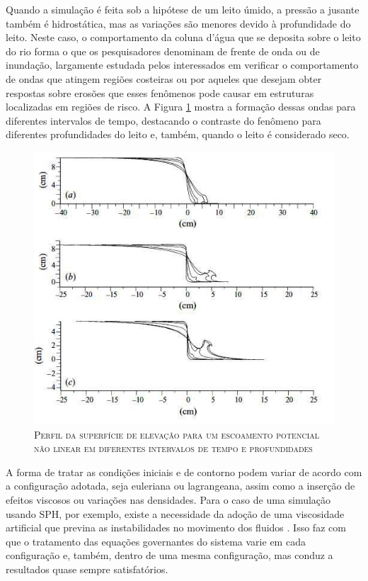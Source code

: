 Quando a simulação é feita sob a hipótese de um leito úmido, a pressão a jusante também é hidrostática, mas as variações são menores devido à profundidade do leito. Neste caso, o comportamento da coluna d'água que se deposita sobre o leito do rio forma o que os pesquisadores denominam de frente de onda ou de inundação, largamente estudada pelos interessados em verificar o comportamento de ondas que atingem regiões costeiras ou por aqueles que desejam obter respostas sobre erosões que esses fenômenos pode causar em estruturas localizadas em regiões de risco. A Figura \ref{fig:stans6} mostra a formação dessas ondas para diferentes intervalos de tempo, destacando o contraste do fenômeno para diferentes profundidades do leito e, também, quando o leito é considerado seco.    

\begin{figure}[H]
\centering
\includegraphics[scale=1]{figuras/stans6.jpg}
\caption{\textsc{Perfil da superfície de elevação para um escoamento potencial não linear em diferentes intervalos de tempo e profundidades}}
\vspace{-0.1cm}
\label{fig:stans6}
\end{figure}

A forma de tratar as condições iniciais e de contorno podem variar de acordo com a configuração adotada, seja euleriana ou lagrangeana, assim como a inserção de efeitos viscosos ou variações nas densidades. Para o caso de uma simulação usando SPH, por exemplo, existe a necessidade da adoção de uma viscosidade artificial que previna as instabilidades no movimento dos fluidos \cite{Monaghan1992}. Isso faz com que o tratamento das equações governantes do sistema varie em cada configuração e, também, dentro de uma mesma configuração, mas conduz a resultados quase sempre satisfatórios.  

